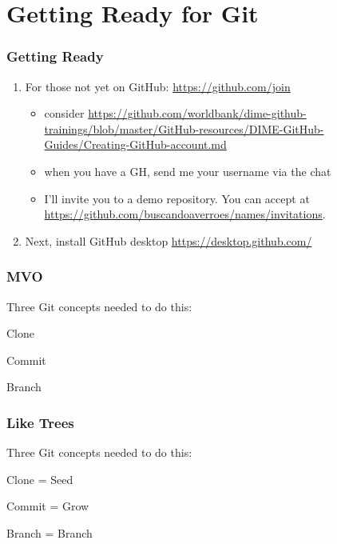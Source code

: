 \documentclass[aspectratio=169]{beamer} %
\newcommand{\trainingURL}[1]{{\color{blue}\url{#1}}}
\newcommand{\traininerUsername}{buscandoaverroes}
\newcommand{\repoName}{\traininerUsername/names}
\newcommand{\trainingRepoURL}[1]{\trainingURL{https://github.com/\repoName #1}}
\begin{document}
\section{Getting Ready for Git}

\begin{frame}
\frametitle{Getting Ready}


	\begin{enumerate}
		\item For those not yet on GitHub: \trainingURL{https://github.com/join}
		\begin{itemize}
			\item consider \url{https://github.com/worldbank/dime-github-trainings/blob/master/GitHub-resources/DIME-GitHub-Guides/Creating-GitHub-account.md}
			\item when you have a GH, send me your username via the chat
			\item I'll invite you to a demo repository. You can accept at \trainingRepoURL{/invitations}.
		\end{itemize}
		\item Next, install GitHub desktop \trainingURL{https://desktop.github.com/}

	\end{enumerate}

\end{frame}



\begin{frame}
\frametitle{MVO}

	\hspace*{2.5cm}\Large{Three Git concepts needed to do this:}

	\begin{itemize}
		\setlength{\itemindent}{3cm}
		\Large{\item Clone}
		\Large{\item Commit}
		\Large{\item Branch}
	\end{itemize}

\end{frame}


\begin{frame}
\frametitle{Like Trees}

	\hspace*{2.5cm}\Large{Three Git concepts needed to do this:}

	\begin{itemize}
		\setlength{\itemindent}{3cm}
		\Large{\item Clone = Seed}
		\Large{\item Commit = Grow}
		\Large{\item Branch = Branch}
	\end{itemize}

\end{frame}
\end{document}

